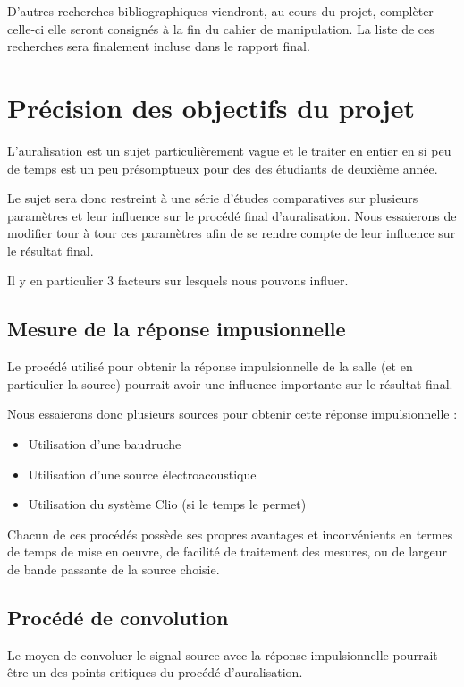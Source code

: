 \documentclass[12pt]{article}
\begin{document}
D'autres recherches bibliographiques viendront, au cours du projet, complèter celle-ci elle seront consignés à la fin du cahier de manipulation. La liste de ces recherches sera finalement incluse dans le rapport final.

\section{Précision des objectifs du projet} %

L'auralisation est un sujet particulièrement vague et le traiter en entier en si peu de temps est un peu présomptueux pour des des étudiants de deuxième année.

Le sujet sera donc restreint à une série d'études comparatives sur plusieurs paramètres et leur influence sur le procédé final d'auralisation.
Nous essaierons de modifier tour à tour ces paramètres afin de se rendre compte de leur influence sur le résultat final.

Il y en particulier 3 facteurs sur lesquels nous pouvons influer.

\subsection{Mesure de la réponse impusionnelle}
Le procédé utilisé pour obtenir la réponse impulsionnelle de la salle (et en particulier la source) pourrait avoir une influence importante sur le résultat final.

Nous essaierons donc plusieurs sources pour obtenir cette réponse impulsionnelle :
\begin{itemize}
	\item Utilisation d'une baudruche
    \item Utilisation d'une source électroacoustique
    \item Utilisation du système Clio (si le temps le permet)
\end{itemize}

Chacun de ces procédés possède ses propres avantages et inconvénients en termes de temps de mise en oeuvre, de facilité de traitement des mesures, ou de largeur de bande passante de la source choisie.

\subsection{Procédé de convolution}
Le moyen de convoluer le signal source avec la réponse impulsionnelle pourrait être un des points critiques du procédé d'auralisation.
\end{document}
